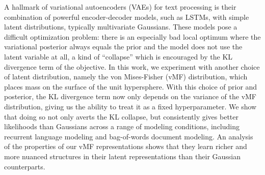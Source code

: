 A hallmark of variational autoencoders (VAEs) for text processing is their combination of powerful encoder-decoder models, such as LSTMs, with simple latent distributions, typically multivariate Gaussians. These models pose a difficult optimization problem: there is an especially bad local optimum where the variational posterior always equals the prior and the model does not use the latent variable at all, a kind of ``collapse'' which is encouraged by the KL divergence term of the objective. In this work, we experiment with another choice of latent distribution, namely the von Mises-Fisher (vMF) distribution, which places mass on the surface of the unit hypersphere. With this choice of prior and posterior, the KL divergence term now only depends on the variance of the vMF distribution, giving us the ability to treat it as a fixed hyperparameter. We show that doing so not only averts the KL collapse, but consistently gives better likelihoods than Gaussians across a range of modeling conditions, including recurrent language modeling and bag-of-words document modeling. An analysis of the properties of our vMF representations shows that they learn richer and more nuanced structures in their latent representations than their Gaussian counterparts.
